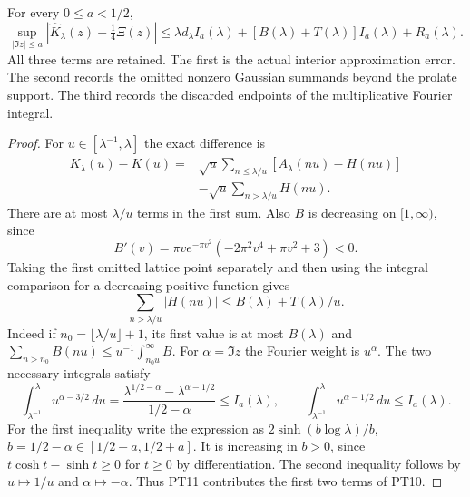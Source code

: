 \documentclass[11pt]{article}
\begin{document}
\begin{swthetatheorem}
For every $0\leq a<1/2$,
\begin{equation}\tag{PT10}
 \sup_{|\Im z|\leq a}
 \left|\widehat K_\lambda(z)-\tfrac14\Xi(z)\right|
 \leq \lambda d_\lambda I_a(\lambda)
       +[B(\lambda)+T(\lambda)]I_a(\lambda)+R_a(\lambda).
\end{equation}
All three terms are retained. The first is the actual interior
approximation error. The second records the omitted nonzero
Gaussian summands beyond the prolate support. The third records
the discarded endpoints of the multiplicative Fourier integral.
\end{swthetatheorem}
\begin{proof}
For $u\in[\lambda^{-1},\lambda]$ the exact difference is
\begin{equation}\tag{PT11}
 \begin{split}
 K_\lambda(u)-K(u)
   ={}&\sqrt u\sum_{n\leq\lambda/u}
                       [A_\lambda(nu)-H(nu)]\\
     &-\sqrt u\sum_{n>\lambda/u}H(nu).
 \end{split}
\end{equation}
There are at most $\lambda/u$ terms in the first sum.
Also $B$ is decreasing on $[1,\infty)$, since
\[
 B'(v)=\pi v e^{-\pi v^2}(-2\pi^2v^4+\pi v^2+3)<0.
\]
Taking the first omitted lattice point separately and then
using the integral comparison for a decreasing positive function gives
\begin{equation}\tag{PT12}
 \sum_{n>\lambda/u}|H(nu)|\leq B(\lambda)+T(\lambda)/u.
\end{equation}
Indeed if $n_0=\lfloor\lambda/u\rfloor+1$, its first value is
at most $B(\lambda)$ and
$\sum_{n>n_0}B(nu)\leq u^{-1}\int_{n_0u}^\infty B$.
For $\alpha=\Im z$ the Fourier weight is $u^\alpha$.
The two necessary integrals satisfy
\[
 \int_{\lambda^{-1}}^\lambda u^{\alpha-3/2}\,du
 =\frac{\lambda^{1/2-\alpha}-\lambda^{\alpha-1/2}}{1/2-\alpha}
 \leq I_a(\lambda),
 \qquad
 \int_{\lambda^{-1}}^\lambda u^{\alpha-1/2}\,du
 \leq I_a(\lambda).
\]
For the first inequality write the expression as
$2\sinh(b\log\lambda)/b$, $b=1/2-\alpha\in[1/2-a,1/2+a]$.
It is increasing in $b>0$, since
$t\cosh t-\sinh t\geq0$ for $t\geq0$ by differentiation.
The second inequality follows by $u\mapsto1/u$ and
$\alpha\mapsto-\alpha$. Thus PT11 contributes the first two
terms of PT10.


\end{proof}
\end{document}
